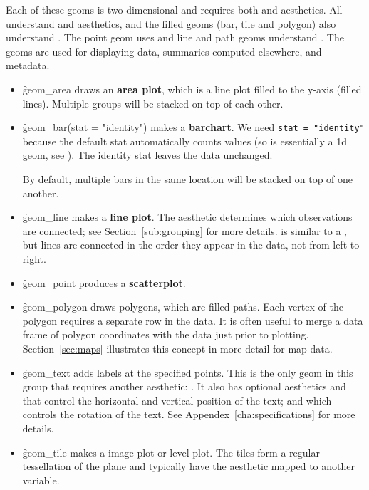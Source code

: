 Each of these geoms is two dimensional and requires both  and  aesthetics.  All understand  and  aesthetics, and the filled geoms (bar, tile and polygon) also understand .  The point geom uses  and line and path geoms understand . The geoms are used for displaying data, summaries computed elsewhere, and metadata.

\begin{itemize}
  \item \f{geom_area} draws an \textbf{area plot}, which is a line plot filled to the y-axis (filled lines).  Multiple groups will be stacked on top of each other.  
  
  \item \f{geom_bar(stat = "identity")} makes a \textbf{barchart}. We need {\tt stat = "identity"} because the default stat automatically counts values (so is essentially a 1d geom, see ). The identity stat leaves the data unchanged.  
  
  By default, multiple bars in the same location will be stacked on top of one another.
  
  \item \f{geom_line} makes a \textbf{line plot}.  The  aesthetic determines which observations are connected; see Section~\ref{sub:grouping} for more details.  is similar to a , but lines are connected in the order they appear in the data, not from left to right.    
  
  \item \f{geom_point} produces a \textbf{scatterplot}. 
  
  \item \f{geom_polygon} draws polygons, which are filled paths.  Each vertex of the polygon requires a separate row in the data.  It is often useful to merge a data frame of polygon coordinates with the data just prior to plotting.  Section~\ref{sec:maps} illustrates this concept in more detail for map data. 
  
  \item \f{geom_text} adds labels at the specified points.  This is the only geom in this group that requires another aesthetic: .  It also has optional aesthetics  and  that control the horizontal and vertical position of the text; and  which controls the rotation of the text.  See Appendex~\ref{cha:specifications} for more details.  
  
  \item \f{geom_tile} makes a image plot or level plot.  The tiles form a regular tessellation of the plane and typically have the  aesthetic mapped to another variable.   

\end{itemize}

